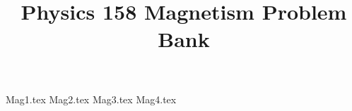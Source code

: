 \documentclass[11pt, fleqn]{article}
\title{Physics 158 Magnetism Problem Bank}
\author{}
\date{}
\begin{document}
\allowdisplaybreaks

\maketitle

{Mag1.tex}
{Mag2.tex}
{Mag3.tex}
{Mag4.tex}
\end{document}
